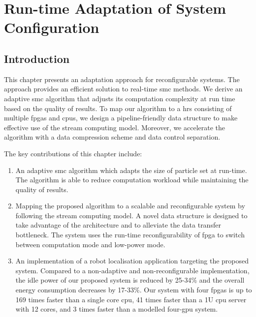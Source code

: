 
\chapter[Run-time Adaptation of System Configuration]{Run-time Adaptation of System Configuration}

\label{ch:adaptation}

\section{Introduction}

This chapter presents an adaptation approach for reconfigurable systems.
The approach provides an efficient solution to real-time \gls{smc} methods.
We derive an adaptive \gls{smc} algorithm that adjusts its computation complexity at run time based on the quality of results.
To map our algorithm to a \gls{hrs} consisting of multiple \gls{fpga}s and \gls{cpu}s,
we design a pipeline-friendly data structure to make effective use of the stream computing model.
Moreover, we accelerate the algorithm with a data compression scheme and data control separation.

The key contributions of this chapter include:

\begin{enumerate}
\item An adaptive \gls{smc} algorithm which adapts the size of particle set at run-time. 
The algorithm is able to reduce computation workload while maintaining the quality of results.
\item Mapping the proposed algorithm to a scalable and reconfigurable system by following the stream computing model.
A novel data structure is designed to take advantage of the architecture and to alleviate the data transfer bottleneck.
The system uses the run-time reconfigurability of \gls{fpga} to switch between computation mode and low-power mode.
\item An implementation of a robot localisation application targeting the proposed system. 
Compared to a non-adaptive and non-reconfigurable implementation, the idle power of our proposed system is reduced by 25-34\% and the overall energy consumption decreases by 17-33\%.
Our system with four \gls{fpga}s is up to 169 times faster than a single core \gls{cpu}, 41 times faster than a 1U \gls{cpu} server with 12 cores, and 3 times faster than a modelled four-\gls{gpu} system.
\end{enumerate}

